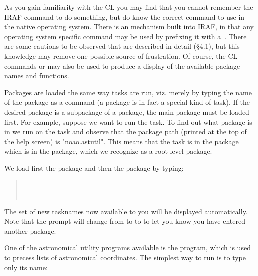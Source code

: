 \begin{quotation}\noindent
{} 
\end{quotation}

As you gain familiarity with the CL you may find that you
cannot remember the IRAF command to do something, but do know the
correct command to use in the native operating system.  There is an
 mechanism built into IRAF, in that any operating system
specific command may be used by prefixing it with a~.
There are some cautions to be observed that are described in detail
(\S 4.1), but this knowledge may remove one possible source of frustration.
Of course, the CL commands  or  may also be used
to produce a display of the available package names and functions.

Packages are loaded the same way tasks are run, viz. merely by typing the name
of the package as a command (a package is in fact a special kind of task).
If the desired package is a subpackage of a package, the main package must
be loaded first.  For example, suppose we want to run the 
task.  To find out what package  is in we run 
on the task  and observe that the package path (printed at
the top of the help screen) is "noao.astutil".  This means that the
 task is in the  package which is in the
 package, which we recognize as a root level package.

We load first the  package and then the 
package by typing:

\begin{quotation}\noindent
{}  \\
  \\
\end{quotation}

\noindent
The set of new tasknames now available to you will be displayed automatically.
Note that the prompt will change from  to 
to  to let you know you have entered another package.

One of the astronomical utility programs available is the 
program, which is used to precess lists of astronomical coordinates.
The simplest way to run  is to type only its name:

\begin{quotation}\noindent
{} 
\end{quotation}

